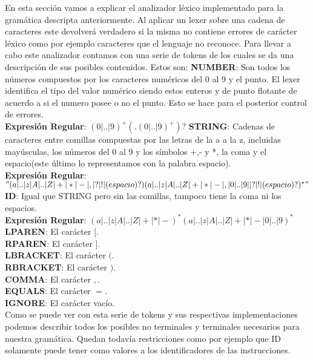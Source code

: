 En esta sección vamos a explicar el analizador léxico implementado para la gramática descripta anteriormente. Al aplicar un
lexer sobre una cadena de caracteres este devolverá verdadero si la misma no contiene errores de carácter léxico como por
ejemplo caracteres que el lenguaje no reconoce. Para llevar a cabo este analizador contamos con una serie de tokens de
los cuales se da una descripción de sus posibles contenidos. Estos son:
\newline
\newline
\textbf{NUMBER}: Son todos los números compuestos por los caracteres numéricos del 0 al 9 y el punto. El lexer identifica el tipo
del valor numérico siendo estos enteros y de punto flotante de acuerdo a si el numero posee o no el punto. Esto se hace
para el posterior control de errores.\\
\textbf{Expresi\'on Regular}: $(0|..|9)^{+}(.(0|..|9)^{+})?$
\newline
\newline
\textbf{STRING}: Cadenas de caracteres entre comillas compuestas por las letras de la a a la z, incluidas mayúsculas, los números del
0 al 9 y los símbolos +,- y *, la coma y el espacio(este último lo representamos con la palabra espacio).\\
\textbf{Expresi\'on Regular}: $"(a|..|z|A|..|Z|+|*|-|,|?|!|(espacio)?)(a|..|z|A|..|Z|+|*|-|,|0|..|9||?|!|(espacio)?)^{*}"$
\newline
\newline
\textbf{ID}: Igual que STRING pero sin las comillas, tampoco tiene la coma ni los espacios.\\
\textbf{Expresi\'on Regular}: $(a|..|z|A|..|Z|+|*|-)^{*}(a|..|z|A|..|Z|+|*|-|0|..|9)^{*}$
\newline
\newline
\textbf{LPAREN}: El carácter $[$.\\
\newline
\textbf{RPAREN}: El carácter $]$.\\
\newline
\textbf{LBRACKET}: El carácter $($.\\
\newline
\textbf{RBRACKET}: El carácter $)$.\\
\newline
\textbf{COMMA}: El carácter $,$.\\
\newline
\textbf{EQUALS}: El carácter $=$.\\
\newline
\textbf{IGNORE}: El carácter vacío.\\
\newline
Como se puede ver con esta serie de tokens y sus respectivas implementaciones podemos describir todos los posibles no terminales y terminales
necesarios para nuestra gramática. Quedan todavía restricciones como por ejemplo que ID solamente puede tener como valores a los
identificadores de las instrucciones.\\
